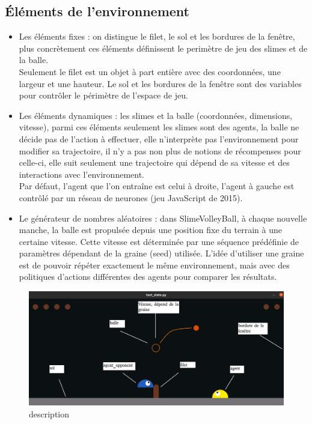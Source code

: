 \documentclass[11pt, a4paper]{article}
\begin{document}
\subsection{\textbf{Éléments de l'environnement}}
\begin{itemize}
  \item Les éléments fixes : on distingue le filet, le sol et les bordures de la fenêtre, plus
  concrètement ces éléments définissent le perimètre de jeu des slimes et de la balle.\\
  Seulement le filet est un objet à part entière avec des coordonnées, une largeur et une hauteur. Le sol et les bordures de la fenêtre sont des 
  variables pour contrôler le périmètre de l'espace de jeu.
  
   \item Les éléments dynamiques : les slimes et la balle (coordonnées, dimensions, vitesse), parmi ces éléments seulement les slimes sont des agents, la balle ne décide pas de l'action
   à effectuer, elle n'interprète pas l'environnement pour modifier sa trajectoire, il n'y a pas non plus de notions de récompenses pour celle-ci, 
   elle suit seulement une trajectoire qui dépend de sa vitesse et des interactions avec l'environnement.\\
   Par défaut, l'agent que l'on entraîne est celui à droite, l'agent à gauche est contrôlé par un réseau de neurones \cite{ha2015slimevolley} (jeu JavaScript de 2015).

   \item Le générateur de nombres aléatoires : dans SlimeVolleyBall, à chaque nouvelle manche, la balle est propulsée depuis une position fixe du terrain à une certaine vitesse. Cette vitesse est déterminée
   par une séquence prédéfinie de paramètres dépendant de la graine (seed) utilisée. 
   L'idée d'utiliser une graine est de pouvoir répéter exactement le même environnement, mais avec des politiques d'actions différentes des agents pour comparer
   les résultats.
  
  \end{itemize}

  \begin{figure}[H]
    \centering
    \includegraphics[scale=0.5]{../images/schema.png}
    \caption {description}
\end{figure}
\end{document}
